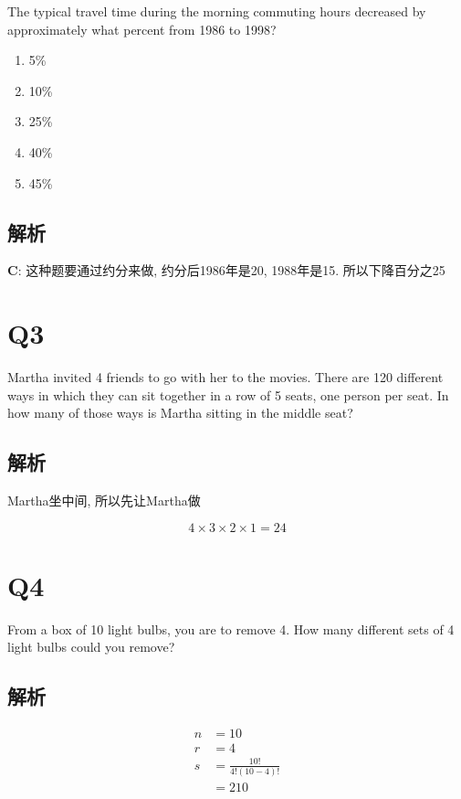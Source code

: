   The typical travel time during the morning commuting hours decreased by
  approximately what percent from 1986 to 1998?

  \begin{enumerate}
    \item 5\%
    \item 10\%
    \item 25\%
    \item 40\%
    \item 45\%
  \end{enumerate}

  \subsection{解析}

    \textbf{C}: 这种题要通过约分来做, 约分后1986年是20, 1988年是15. 所以下降百分之25

\section{Q3}

  Martha invited 4 friends to go with her to the movies. There are 120
  different ways in which they can sit together in a row of 5 seats,
  one person per seat. In how many of those ways is Martha sitting in the
  middle seat?

  \subsection{解析}

    Martha坐中间, 所以先让Martha做

    \begin{equation*}
      4 \times 3 \times 2 \times 1 = 24
    \end{equation*}

\section{Q4}

  From a box of 10 light bulbs, you are to remove 4. How many different sets
  of 4 light bulbs could you remove?

  \subsection{解析}

    \begin{align*}
      n &= 10 \\
      r &= 4 \\
      s &= \frac{10!}{4!\left( 10 - 4 \right)!} \\
      &= 210
    \end{align*}

